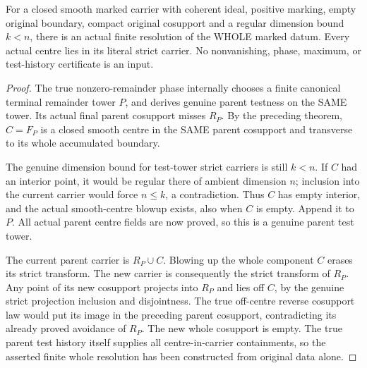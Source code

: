 \begin{theorem}
\label{hir:nc-coefficient-zero-selected-append-resolution}
\leanok
For a closed smooth marked carrier with coherent ideal, positive marking,
empty original boundary, compact original cosupport and a regular dimension
bound $k<n$, there is an actual finite resolution of the WHOLE marked datum.
Every actual centre lies in its literal strict carrier. No nonvanishing,
phase, maximum, or test-history certificate is an input.
\end{theorem}
\begin{proof}
The true nonzero-remainder phase internally chooses a finite canonical terminal
remainder tower $P$, and derives genuine parent testness on the SAME tower.
Its actual final parent cosupport misses $R_P$. By the preceding theorem,
$C=F_P$ is a closed smooth centre in the SAME parent cosupport and transverse
to its whole accumulated boundary.

The genuine dimension bound for test-tower strict carriers is still $k<n$.
If $C$ had an interior point, it would be regular there of ambient dimension
$n$; inclusion into the current carrier would force $n\le k$, a contradiction.
Thus $C$ has empty interior, and the actual smooth-centre blowup exists, also
when $C$ is empty. Append it to $P$. All actual parent centre fields are now
proved, so this is a genuine parent test tower.

The current parent carrier is $R_P\cup C$. Blowing up the whole component
$C$ erases its strict transform. The new carrier is consequently the strict
transform of $R_P$. Any point of its new cosupport projects into $R_P$ and
lies off $C$, by the genuine strict projection inclusion and disjointness.
The true off-centre reverse cosupport law would put its image in the preceding
parent cosupport, contradicting its already proved avoidance of $R_P$.
The new whole cosupport is empty. The true parent test history itself supplies
all centre-in-carrier containments, so the asserted finite whole resolution
has been constructed from original data alone.
\end{proof}

